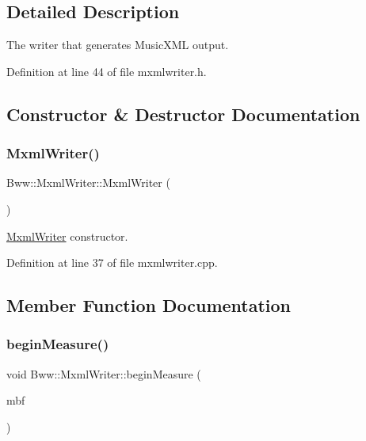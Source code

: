 \subsection{Detailed Description}
The writer that generates Music\+X\+ML output. 

Definition at line 44 of file mxmlwriter.\+h.



\subsection{Constructor \& Destructor Documentation}
\mbox{\label{class_bww_1_1_mxml_writer_ad37a20d16beb0ea1d91b7844ec0b8065}} 
\subsubsection{\texorpdfstring{Mxml\+Writer()}{MxmlWriter()}}
{\footnotesize\ttfamily Bww\+::\+Mxml\+Writer\+::\+Mxml\+Writer (\begin{DoxyParamCaption}{ }\end{DoxyParamCaption})}

\hyperlink{class_bww_1_1_mxml_writer}{Mxml\+Writer} constructor. 

Definition at line 37 of file mxmlwriter.\+cpp.



\subsection{Member Function Documentation}
\mbox{\label{class_bww_1_1_mxml_writer_a344feb211f8ea206a599bad2a71f9320}} 
\subsubsection{\texorpdfstring{begin\+Measure()}{beginMeasure()}}
{\footnotesize\ttfamily void Bww\+::\+Mxml\+Writer\+::begin\+Measure (\begin{DoxyParamCaption}\item[{const \hyperlink{struct_bww_1_1_measure_begin_flags}{Bww\+::\+Measure\+Begin\+Flags}}]{mbf }\end{DoxyParamCaption})\hspace{0.3cm}{\ttfamily [virtual]}}

